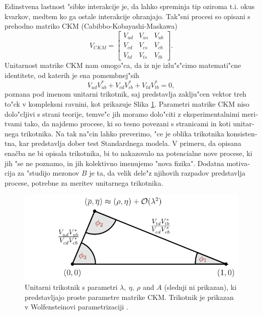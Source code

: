 \begin{otherlanguage}{slovene}
Edinstvena lastnost "sibke interakcije je, da lahko spreminja tip oziroma t.i. okus kvarkov, medtem ko ga ostale interakcije ohranjajo. Tak"sni procesi so opisani s prehodno matriko CKM (Cabibbo-Kobayashi-Maskawa) \cite{cabibbo1963unitary,kobayashi1973cp}
\begin{equation}
V_{CKM} = \begin{bmatrix}
    V_{ud} & V_{us} & V_{ub}\\
	V_{cd} & V_{cs} & V_{cb}\\
	V_{td} & V_{ts} & V_{tb}
\end{bmatrix}.
\end{equation}
Unitarnost matrike CKM nam omogo"ca, da iz nje izlu"s"cimo matemati"cne identitete, od katerih je ena pomembnej"sih
\begin{equation}
V_{ud}V_{ub}^* + V_{cd}V_{cb}^* + V_{td}V_{tb}^* = 0,
\end{equation}
poznana pod imenom unitarni trikotnik, saj predstavlja zaklju"cen vektor treh to"ck v kompleksni ravnini, kot prikazuje Slika \ref{fig:ut_si}. Parametri matrike CKM niso dolo"cljivi s strani teorije, temve"c jih moramo dolo"citi z eksperimentalnimi meritvami tako, da najdemo procese, ki so tesno povezani s stranicami in koti unitarnega trikotnika. Na tak na"cin lahko preverimo, "ce je oblika trikotnika konsistentna, kar predstavlja dober test Standardnega modela. V primeru, da opisana enačba ne bi opisala trikotnika, bi to nakazovalo na potencialne nove procese, ki jih "se ne poznamo, in jih kolektivno imenujemo "nova fizika". Dodatna motivacija za "studijo mezonov $B$ je ta, da velik dele"z njihovih razpadov predstavlja procese, potrebne za meritev unitarnega trikotnika.
\begin{figure}[!htb]
\centering
\includegraphics[scale=1]{texfig/UT_Triangle}
\caption{Unitarni trikotnik s parametri $\lambda,~\eta,~\rho$ and $A$ (slednji ni prikazan), ki predstavljajo proste parametre matrike CKM. Trikotnik je prikazan v Wolfensteinovi parametrizaciji \cite{PhysRevLett.51.1945}.}
\label{fig:ut_si}
\end{figure}


\end{otherlanguage}
